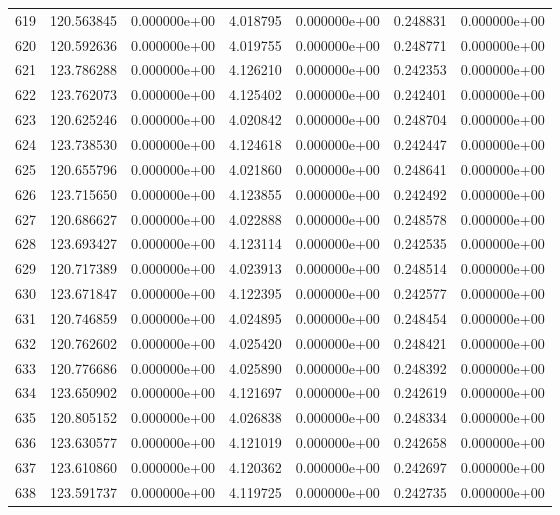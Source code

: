 \begin{tabular}{rrrrrrr}
 619 & 120.563845 &  0.000000e+00 &  4.018795 &  0.000000e+00 &    0.248831 &  0.000000e+00 \\
 620 & 120.592636 &  0.000000e+00 &  4.019755 &  0.000000e+00 &    0.248771 &  0.000000e+00 \\
 621 & 123.786288 &  0.000000e+00 &  4.126210 &  0.000000e+00 &    0.242353 &  0.000000e+00 \\
 622 & 123.762073 &  0.000000e+00 &  4.125402 &  0.000000e+00 &    0.242401 &  0.000000e+00 \\
 623 & 120.625246 &  0.000000e+00 &  4.020842 &  0.000000e+00 &    0.248704 &  0.000000e+00 \\
 624 & 123.738530 &  0.000000e+00 &  4.124618 &  0.000000e+00 &    0.242447 &  0.000000e+00 \\
 625 & 120.655796 &  0.000000e+00 &  4.021860 &  0.000000e+00 &    0.248641 &  0.000000e+00 \\
 626 & 123.715650 &  0.000000e+00 &  4.123855 &  0.000000e+00 &    0.242492 &  0.000000e+00 \\
 627 & 120.686627 &  0.000000e+00 &  4.022888 &  0.000000e+00 &    0.248578 &  0.000000e+00 \\
 628 & 123.693427 &  0.000000e+00 &  4.123114 &  0.000000e+00 &    0.242535 &  0.000000e+00 \\
 629 & 120.717389 &  0.000000e+00 &  4.023913 &  0.000000e+00 &    0.248514 &  0.000000e+00 \\
 630 & 123.671847 &  0.000000e+00 &  4.122395 &  0.000000e+00 &    0.242577 &  0.000000e+00 \\
 631 & 120.746859 &  0.000000e+00 &  4.024895 &  0.000000e+00 &    0.248454 &  0.000000e+00 \\
 632 & 120.762602 &  0.000000e+00 &  4.025420 &  0.000000e+00 &    0.248421 &  0.000000e+00 \\
 633 & 120.776686 &  0.000000e+00 &  4.025890 &  0.000000e+00 &    0.248392 &  0.000000e+00 \\
 634 & 123.650902 &  0.000000e+00 &  4.121697 &  0.000000e+00 &    0.242619 &  0.000000e+00 \\
 635 & 120.805152 &  0.000000e+00 &  4.026838 &  0.000000e+00 &    0.248334 &  0.000000e+00 \\
 636 & 123.630577 &  0.000000e+00 &  4.121019 &  0.000000e+00 &    0.242658 &  0.000000e+00 \\
 637 & 123.610860 &  0.000000e+00 &  4.120362 &  0.000000e+00 &    0.242697 &  0.000000e+00 \\
 638 & 123.591737 &  0.000000e+00 &  4.119725 &  0.000000e+00 &    0.242735 &  0.000000e+00 \\

\end{tabular}
